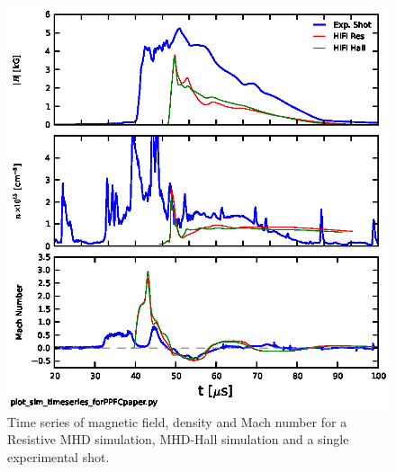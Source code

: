 \documentclass[12pt]{iopart}
\begin{document}
\begin{figure}[!htbp]
\centerline{
\includegraphics[width=16cm]{simtimeseries64.eps}}
\caption{\label{fig:simtimeseries64} Time series of magnetic field, density and Mach number for a Resistive MHD simulation, MHD-Hall simulation and a single experimental shot.}
\end{figure}
\end{document}

